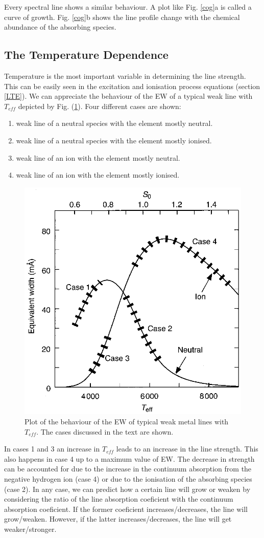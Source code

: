 \documentclass[dvips,12pt,a4paper]{report}
\begin{document}
{Every spectral line shows a similar behaviour. A plot like Fig. \ref{cog}a is called a curve of growth. Fig. \ref{cog}b shows the line profile change with the chemical abundance of the absorbing species.

\subsection{The Temperature Dependence}

Temperature is the most important variable in determining the line strength. This can be easily seen in the excitation and ionisation process equations (section \ref{LTE}).
We can appreciate the behaviour of the EW of a typical weak line with $T_{eff}$ depicted by Fig. (\ref{ewdp}). Four different cases are shown:
\begin{enumerate}
 \item weak line of a neutral species with the element mostly neutral.
 \item weak line of a neutral species with the element mostly ionised.
 \item weak line of an ion with the element mostly neutral.
 \item weak line of an ion with the element mostly ionised.
\end{enumerate}
\begin{figure}[h]
\centering
\includegraphics[height=6 cm]{pics/parte2/temperature.eps}
\caption[EW dependence on Temperature and Pressure] {Plot of the behaviour of the EW of typical weak metal lines with $T_{eff}$. The cases discussed in the text are shown.}%
\label{ewdp}
\end{figure}

In cases 1 and 3 an increase in $T_{eff}$ leads to an increase in the line strength. This also happens in case 4 up to a maximum value of EW. The decrease in strength can be accounted for due to the increase in the continuum absorption from the negative hydrogen ion (case 4) or due to the ionisation of the absorbing species (case 2). In any case, we can predict how a certain line will grow or weaken by considering the ratio of the line absorption coeficient with the continuum absorption coeficient. If the former coeficient increases/decreases, the line will grow/weaken. However, if the latter increases/decreases, the line will get weaker/stronger.

}
\end{document}
